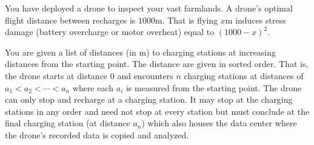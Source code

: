\documentclass[a4paper]{exam}
\begin{document}
\begin{questions}



  You have deployed a drone to inspect your vast farmlands. A drone's optimal flight distance between recharges is $1000$m. That is flying $x$m induces stress damage (battery overcharge or motor overheat) equal to $(1000-x)^2$.

  You are given a list of distances (in m) to charging stations at increasing distances from the starting point. The distance are given in sorted order. That is, the drone starts at distance $0$ and encounters $n$ charging stations at distances of $a_1 < a_2 < \cdots < a_n$ where each $a_i$ is measured from the starting point. The drone can only stop and recharge at a charging station. It may stop at the charging stations in any order and need not stop at every station but must conclude at the final charging station (at distance $a_n$) which also houses the data center where the drone's recorded data is copied and analyzed.


\end{questions}
\end{document}
